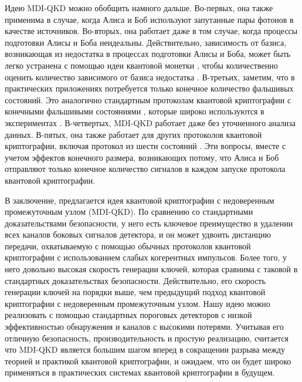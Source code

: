 Идею MDI-QKD можно обобщить намного дальше. Во-первых, она также применима в случае, когда Алиса и Боб используют запутанные пары фотонов в качестве источников. Во-вторых, она работает даже в том случае, когда процессы подготовки Алисы и Боба неидеальны. Действительно, зависимость от базиса, возникающая из недостатка в процессах подготовки Алисы и Боба, может быть легко устранена с помощью идеи квантовой монетки \cite{gottesman2004,koashi2005}, чтобы количественно оценить количество зависимого от базиса недостатка \cite{tamaki2012}. В-третьих, заметим, что в практических приложениях потребуется только конечное количество фальшивых состояний. Это аналогично стандартным протоколам квантовой криптографии с конечными фальшивыми состояниями \cite{ma2005}, которые широко используются в экспериментах \cite{rosenberg2009}. В-четвертых, MDI-QKD работает даже без уточненного анализа данных. В-пятых, она также работает для других протоколов квантовой криптографии, включая протокол из шести состояний \cite{fuchs1997}. Эти вопросы, вместе с учетом эффектов конечного размера, возникающих потому, что Алиса и Боб отправляют только конечное количество сигналов в каждом запуске протокола квантовой криптографии\cite{tamaki2012}.

В заключение, предлагается идея квантовой криптографии с недоверенным промежуточным узлом (MDI-QKD). По сравнению со стандартными доказательствами безопасности, у него есть ключевое преимущество в удалении всех каналов боковых сигналов детектора, и он может удвоить дистанцию передачи, охватываемую с помощью обычных протоколов квантовой криптографии с использованием слабых когерентных импульсов. Более того, у него довольно высокая скорость генерации ключей, которая сравнима с таковой в стандартных доказательствах безопасности. Действительно, его скорость генерации ключей на порядки выше, чем предыдущий подход  квантовой криптографии с недоверенным промежуточным узлом. Нашу идею можно реализовать с помощью стандартных пороговых детекторов с низкой эффективностью обнаружения и каналов с высокими потерями. Учитывая его отличную безопасность, производительность и простую реализацию, считается что MDI-QKD является большим шагом вперед в сокращении разрыва между теорией и практикой квантовой криптографии, и ожидаем, что он будет широко применяться в практических системах квантовой криптографии в будущем.
